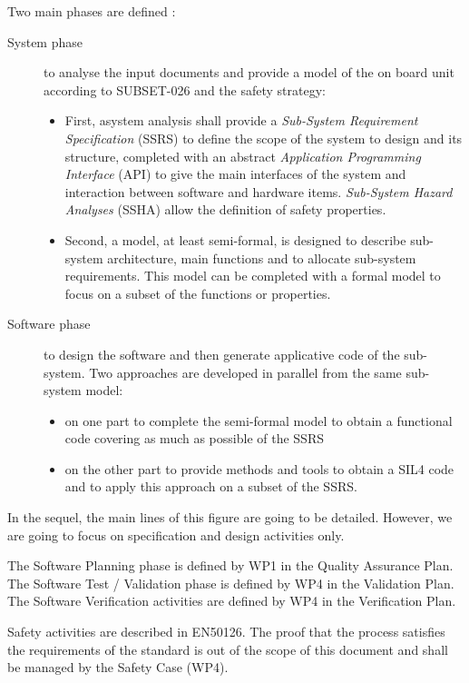 Two main phases are defined :
\begin{description}
\item[System phase] to analyse the input documents and provide a model of the on
  board unit according to SUBSET-026 and the safety strategy:
\begin{itemize}
\item First, asystem analysis shall provide a \textit{Sub-System Requirement Specification} (SSRS) to define the scope of the system to  design and its structure, completed with an abstract \textit{Application Programming Interface} (API) to  give the main interfaces of the system and interaction between software and hardware items. \textit{Sub-System Hazard Analyses} (SSHA) allow the definition of safety properties.
\item Second, a model, at least semi-formal, is designed to describe sub-system
  architecture, main functions and to allocate sub-system requirements. This
  model can be completed with a formal model to focus on a subset of the
  functions or properties.
\end{itemize}
\item[Software phase] to design the software and then generate applicative code
  of the sub-system. Two approaches are developed in parallel from the same
  sub-system model:
\begin{itemize}
\item on one part to complete the semi-formal model to obtain a functional code covering as much as possible of the SSRS
\item on the other part to provide methods and tools to  obtain a SIL4 code and to apply this approach on a subset of the SSRS.
\end{itemize}
\end{description} 

In the sequel, the main lines of this figure are going to be detailed. However, we are going to focus on specification and design activities only.

The Software Planning phase is defined by WP1 in the Quality Assurance Plan.
The Software Test / Validation phase is defined by WP4 in the Validation Plan.
The Software Verification activities are defined by WP4 in the Verification Plan.

Safety activities are described in EN50126.
The proof that the process satisfies the requirements of the standard is out of the scope of this document and shall be managed by the Safety Case (WP4).



